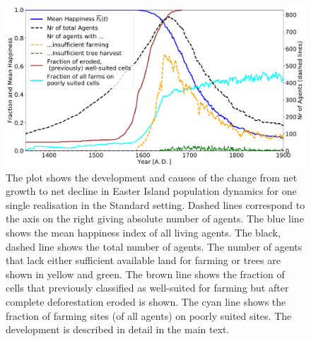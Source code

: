 \begin{figure}
	\centering
	\includegraphics[width=\textwidth]{images/Results/Standard/STDsecondaryStats}
	\caption{The plot shows the development and causes of the change from net growth to net decline in Easter Island population dynamics for one single realisation in the Standard setting.
	Dashed lines correspond to the axis on the right giving absolute number of agents.
	The blue line shows the mean happiness index of all living agents. The black, dashed line shows the total number of agents. The number of agents that lack either sufficient available land for farming or trees are shown in yellow and green. The brown line shows the fraction of cells that previously classified as well-suited for farming but after complete deforestation eroded is shown. The cyan line shows the fraction of farming sites (of all agents) on poorly suited sites.
	The development is described in detail in the main text.}
	\label{fig:STDsecondayrstats}
\end{figure}




